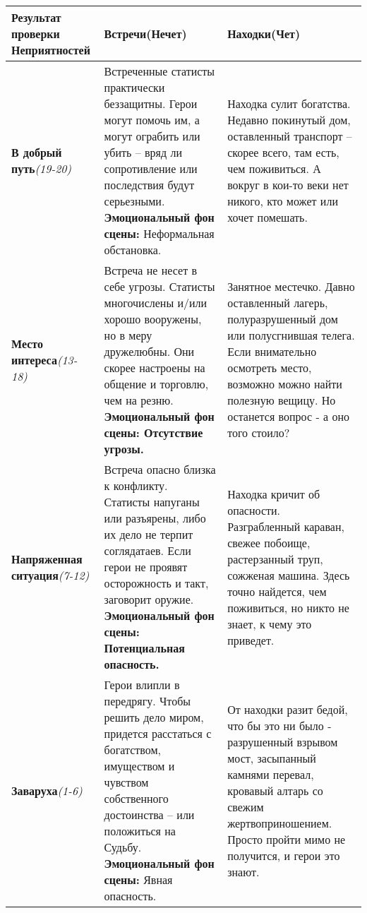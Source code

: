 \begin{center} \begin{tabular}{|p{3cm}|p{6.5cm}|p{6.5cm}|} \hline
\textbf{Результат проверки Неприятностей} & \textbf{Встречи(Нечет)} & \textbf{Находки(Чет)} \\ \hline
\textbf{В добрый путь}\newline\textit{(19-20)} & Встреченные статисты практически беззащитны. Герои могут помочь им, а могут ограбить или убить – вряд ли сопротивление или последствия будут серьезными. \newline \textbf{Эмоциональный фон сцены:} Неформальная обстановка. & Находка сулит богатства. Недавно покинутый дом, оставленный транспорт – скорее всего, там есть, чем поживиться. А вокруг в кои-то веки нет никого, кто может или хочет помешать. \\ \hline
\textbf{Место интереса}\newline\textit{(13-18)} & Встреча не несет в себе угрозы. Статисты многочислены и/или хорошо вооружены, но в меру дружелюбны. Они скорее настроены на общение и торговлю, чем на резню. \newline \textbf{Эмоциональный фон сцены: Отсутствие угрозы.} & Занятное местечко. Давно оставленный лагерь, полуразрушенный дом или полусгнившая телега. Если внимательно осмотреть место, возможно можно найти полезную вещицу. Но останется вопрос - а оно того стоило? \\ \hline
\textbf{Напряженная ситуация}\newline\textit{(7-12)} & Встреча опасно близка к конфликту. Статисты напуганы или разъярены, либо их дело не терпит соглядатаев. Если герои не проявят осторожность и такт, заговорит оружие. \newline \textbf{Эмоциональный фон сцены: Потенциальная опасность.} & Находка кричит об опасности. Разграбленный караван, свежее побоище, растерзанный труп, сожженая машина. Здесь точно найдется, чем поживиться, но никто не знает, к чему это приведет. \\ \hline
\textbf{Заваруха}\newline\textit{(1-6)} & Герои влипли в передрягу. Чтобы решить дело миром, придется расстаться с богатством, имуществом и чувством собственного достоинства – или положиться на Судьбу.
\newline \textbf{Эмоциональный фон сцены:} Явная опасность. & От находки разит бедой, что бы это ни было - разрушенный взрывом мост, засыпанный камнями перевал, кровавый алтарь со свежим жертвоприношением. Просто пройти мимо не получится, и герои это знают. \\ \hline
\end{tabular} \end{center}

